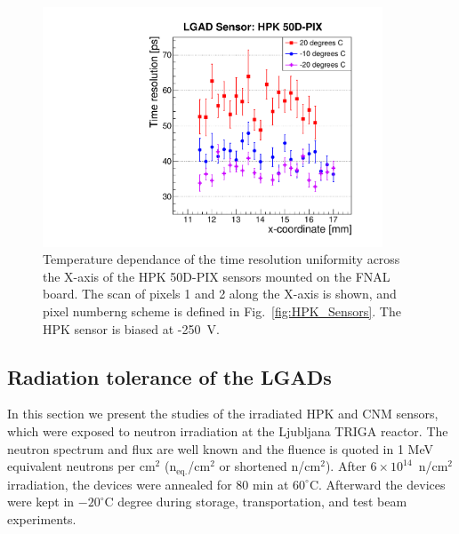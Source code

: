 \documentclass[preprint,1p]{elsarticle}
\begin{document}
\begin{figure}[htbp] 
\centering
\includegraphics[width=0.9\textwidth]{figs/FNAL_TimeResolution_vs_X_HPK50D_TemperatureDependance.pdf} 
\caption{Temperature dependance of the time resolution uniformity across the
X-axis of the HPK 50D-PIX sensors mounted on the FNAL board. The scan of pixels
1 and 2 along the X-axis is shown, and pixel numberng scheme is defined in
Fig.~\ref{fig:HPK_Sensors}. The HPK sensor is biased at -250~V.} 
\label{fig:TimeResolution_vs_X_HPK50D_TemperatureDependance} 
\end{figure} 




\subsection{Radiation tolerance of the LGADs}
\label{sec:rad_tolerance}

In this section we present the studies of the irradiated HPK and CNM sensors,
which were exposed to neutron irradiation at the Ljubljana TRIGA reactor. The
neutron spectrum and flux are well known and the fluence is quoted in 1 MeV
equivalent neutrons per cm$^2$ (n$_{\mathrm{eq.}}$/cm$^2$ or shortened
n/cm$^2$). After $6\times 10^{14}$~n/cm$^2$ irradiation, the devices were
annealed for 80 min at $60^{\circ}$C. Afterward the devices were kept in
$-20^{\circ}$C degree during storage, transportation, and test beam experiments.
\end{document}
